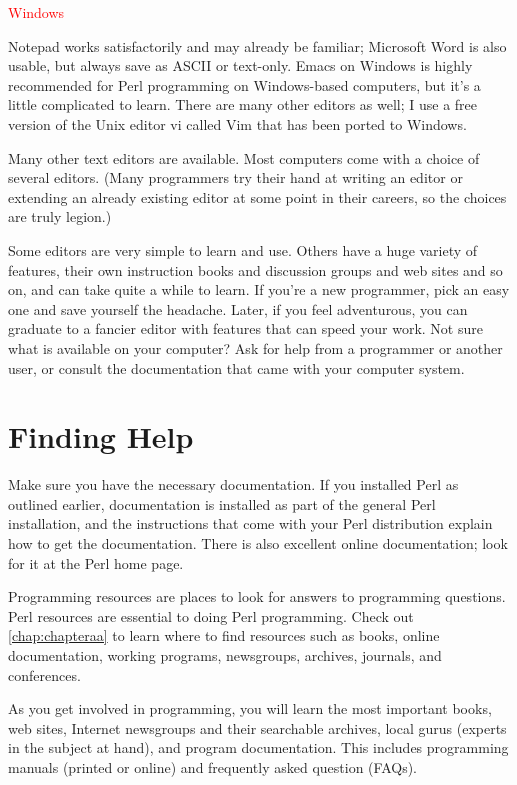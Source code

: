 \textcolor{red}{Windows}
\begin{adjustwidth}{1cm}{}
Notepad works satisfactorily and may already be familiar; Microsoft Word is also usable, but always save as ASCII or text-only. Emacs on Windows is highly recommended for Perl programming on Windows-based computers, but it's a little complicated to learn. There are many other editors as well; I use a free version of the Unix editor vi called Vim that has been ported to Windows.
\end{adjustwidth}

Many other text editors are available. Most computers come with a choice of several editors. (Many programmers try their hand at writing an editor or extending an already existing editor at some point in their careers, so the choices are truly legion.)

Some editors are very simple to learn and use. Others have a huge variety of features, their own instruction books and discussion groups and web sites and so on, and can take quite a while to learn. If you're a new programmer, pick an easy one and save yourself the headache. Later, if you feel adventurous, you can graduate to a fancier editor with features that can speed your work. Not sure what is available on your computer? Ask for help from a programmer or another user, or consult the documentation that came with your computer system. 

\section{Finding Help}
Make sure you have the necessary documentation. If you installed Perl as outlined earlier, documentation is installed as part of the general Perl installation, and the instructions that come with your Perl distribution explain how to get the documentation. There is also excellent online documentation; look for it at the Perl home page.

Programming resources are places to look for answers to programming questions. Perl resources are essential to doing Perl programming. Check out \autoref{chap:chapteraa} to learn where to find resources such as books, online documentation, working programs, newsgroups, archives, journals, and conferences.

As you get involved in programming, you will learn the most important books, web sites, Internet newsgroups and their searchable archives, local gurus (experts in the subject at hand), and program documentation. This includes programming manuals (printed or online) and frequently asked question (FAQs).

